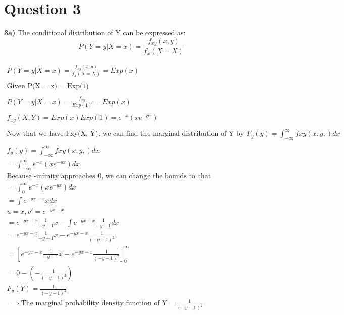 \section{Question 3}

\textbf{3a)} The conditional distribution of Y can be expressed as:
$$P(Y = y | X = x)  = \frac{f_{xy}(x,y)}{f_{x}(X = X)}$$

\begin{equation}
    \begin{split}
        P(Y = y | X = x)  = \frac{f_{xy}(x,y)}{f_{x}(X = X)} = Exp(x) \\ \\
        \text{Given P(X = x) = Exp(1)} \\ \\
        P(Y = y | X = x)  = \frac{f_{xy}}{Exp(1)} = Exp(x) \\ \\
        f_{xy}(X, Y) = Exp(x)Exp(1) = e^{-x} \left(xe^{-yx}\right)\\ \\
        \text{Now that we have Fxy(X, Y), we can find the marginal distribution of Y by } F_y(y) = \int^{\infty}_{-\infty} fxy(x,y,) dx \\\\
        f_y(y) = \int^{\infty}_{-\infty} fxy(x,y,) dx \\
        = \int^{\infty}_{-\infty} e^{-x} \left(xe^{-yx}\right) dx \\
        \text{Because -infinity approaches 0, we can change the bounds to that} \\
        = \int^{\infty}_{0} e^{-x} \left(xe^{-yx}\right) dx \\
        = \int e^{-yx-x}xdx \\
        u=x, v'=e^{-yx-x} \\
        = e^{-yx-x}\frac{1}{-y-1}x-\int e^{-yx-x}\frac{1}{-y-1}dx \\
        = e^{-yx-x}\frac{1}{-y-1}x-e^{-yx-x}\frac{1}{\left(-y-1\right)^2} \\
        = \left[e^{-yx-x}\frac{1}{-y-1}x-e^{-yx-x}\frac{1}{\left(-y-1\right)^2}\right]^\infty_0 \\
        = 0 - \left(-\frac{1}{\left(-y-1\right)^2}\right) \\
        F_y(Y) = \frac{1}{\left(-y-1\right)^2}  \\
        \implies \text{The marginal probability density function of Y} = \frac{1}{\left(-y-1\right)^2}
    \end{split}
\end{equation}

